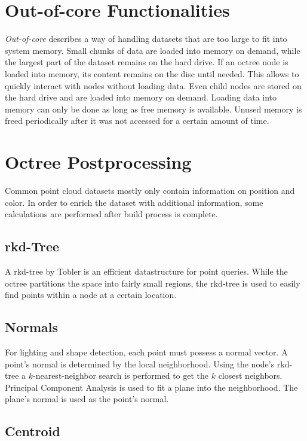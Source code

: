 \section{Out-of-core Functionalities}

\textit{Out-of-core} describes a way of handling datasets that are too large to fit into system memory. Small chunks of data are loaded into memory on demand, while the largest part of the dataset remains on the hard drive. If an octree node is loaded into memory, its content remains on the disc until needed. This allows to quickly interact with nodes without loading data. Even child nodes are stored on the hard drive and are loaded into memory on demand. 
Loading data into memory can only be done as long as free memory is available. Unused memory is freed periodically after it was not accessed for a certain amount of time. 


\section{Octree Postprocessing}

Common point cloud datasets mostly only contain information on position and color. In order to enrich the dataset with additional information, some calculations are performed after build process is complete. 


\subsection{rkd-Tree}

A rkd-tree by Tobler\cite{tobler2011rkd} is an efficient datastructure for point queries. While the octree partitions the space into fairly small regions, the rkd-tree is used to easily find points within a node at a certain location. 


\subsection{Normals}

For lighting and shape detection, each point must possess a normal vector. A point's normal is determined by the local neighborhood. Using the node's rkd-tree a $k$-nearest-neighbor search is performed to get the $k$ closest neighbors. Principal Component Analysis\cite{jolliffe2002principal} is used to fit a plane into the neighborhood. The plane's normal is used as the point's normal.


\subsection{Centroid}

